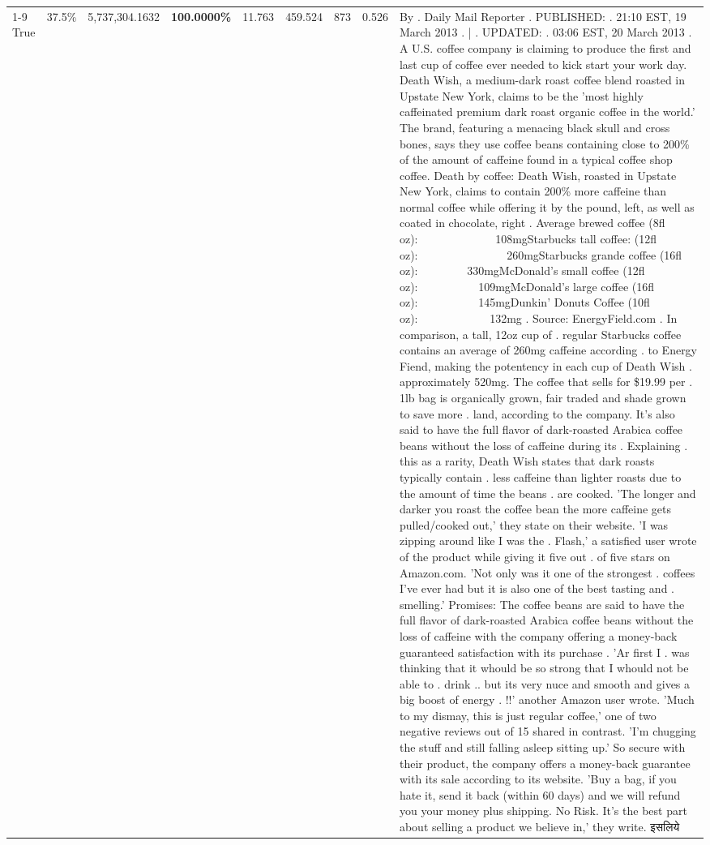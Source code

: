 \begin{table}[H]
{\begin{tabular}{lllrlllll}
\cline{1-9}
True & 37.5\% & 5,737,304.1632 & \bfseries \color{red} 100.0000\% & 11.763 & 459.524 & 873 & 0.526 & By . Daily Mail Reporter . PUBLISHED: . 21:10 EST, 19 March 2013 . | . UPDATED: . 03:06 EST, 20 March 2013 . A U.S. coffee company is claiming to produce the first and last cup of coffee ever needed to kick start your work day. Death Wish, a medium-dark roast coffee blend roasted in Upstate New York, claims to be the 'most highly caffeinated premium dark roast organic coffee in the world.' The brand, featuring a menacing black skull and cross bones, says they use coffee beans containing close to 200\% of the amount of caffeine found in a typical coffee shop coffee. Death by coffee: Death Wish, roasted in Upstate New York, claims to contain 200\% more caffeine than normal coffee while offering it by the pound, left, as well as coated in chocolate, right . Average brewed coffee (8fl oz):              108mgStarbucks tall coffee: (12fl oz):                260mgStarbucks grande coffee (16fl oz):         330mgMcDonald's small coffee (12fl oz):           109mgMcDonald's large coffee (16fl oz):           145mgDunkin' Donuts Coffee (10fl oz):             132mg . Source: EnergyField.com . In comparison, a tall, 12oz cup of . regular Starbucks coffee contains an average of 260mg caffeine according . to Energy Fiend, making the potentency in each cup of Death Wish . approximately 520mg. The coffee that sells for \$19.99 per . 1lb bag is organically grown, fair traded and shade grown to save more . land, according to the company. It's also said to have the full flavor of dark-roasted Arabica coffee beans without the loss of caffeine during its . Explaining . this as a rarity, Death Wish states that dark roasts typically contain . less caffeine than lighter roasts due to the amount of time the beans . are cooked. 'The longer and darker you roast the coffee bean the more caffeine gets pulled/cooked out,' they state on their website. 'I was zipping around like I was the . Flash,' a satisfied user wrote of the product while giving it five out . of five stars on Amazon.com. 'Not only was it one of the strongest . coffees I've ever had but it is also one of the best tasting and . smelling.’ Promises: The coffee beans are said to have the full flavor of dark-roasted Arabica coffee beans without the loss of caffeine with the company offering a money-back guaranteed satisfaction with its purchase . 'Ar first I . was thinking that it whould be so strong that I whould not be able to . drink .. but its very nuce and smooth and gives a big boost of energy . !!' another Amazon user wrote. 'Much to my dismay, this is just regular coffee,' one of two negative reviews out of 15 shared in contrast. 'I'm chugging the stuff and still falling asleep sitting up.' So secure with their product, the company offers a money-back guarantee with its sale according to its website. 'Buy a bag, if you hate it, send it back (within 60 days) and we will refund you your money plus shipping. No Risk. It’s the best part about selling a product we believe in,' they write. इसलिये \\

\end{tabular}}
\end{table}
